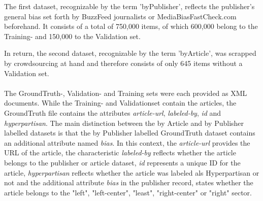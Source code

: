 \documentclass[a4paper, 11pt,titlepage,oneside,openany]{book}
\begin{document}
 \noindent The first dataset, recognizable by the term 'byPublisher', reflects the publisher's general bias set forth by BuzzFeed journalists or MediaBiasFastCheck.com beforehand. It consists of a total of 750,000 items, of which 600,000 belong to the Training- and 150,000 to the Validation set.
 
 \noindent In return, the second dataset, recognizable by the term 'byArticle', was scrapped by crowdsourcing at hand and therefore consists of only 645 items without a Validation set.\\
 \\
The GroundTruth-, Validation- and Training sets were each provided as XML documents. While the Training- and Validationset contain the articles, the GroundTruth file contains the attributes \textit{article-url}, \textit{labeled-by}, \textit{id} and \textit{hyperpartisan}. The main distinction between the by Article and by Publisher labelled datasets is that the by Publisher labelled GroundTruth dataset contains an additional attribute named \textit{bias}. In this context, the \textit{article-url} provides the URL of the article, the characteristic \textit{labeled-by} reflects whether the article belongs to the publisher or article dataset, \textit{id} represents a unique ID for the article, \textit{hyperpartisan} reflects whether the article was labeled als Hyperpartisan or not and the additional attribute \textit{bias} in the publisher record, states whether the article belongs to the "left", "left-center", "least", "right-center" or "right" sector.
 
\end{document}
